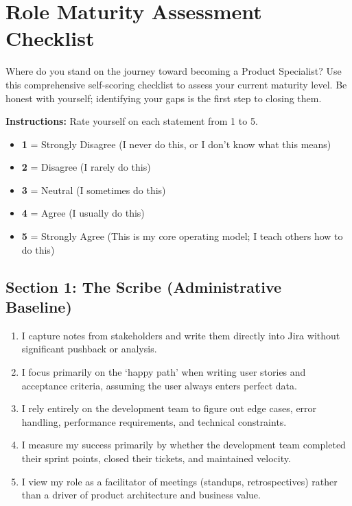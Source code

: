 \section{Role Maturity Assessment
Checklist}\label{role-maturity-assessment-checklist}

Where do you stand on the journey toward becoming a Product Specialist?
Use this comprehensive self-scoring checklist to assess your current
maturity level. Be honest with yourself; identifying your gaps is the
first step to closing them.

\textbf{Instructions:} Rate yourself on each statement from 1 to 5.

\begin{itemize}
\tightlist
\item
  \textbf{1} = Strongly Disagree (I never do this, or I don't know what
  this means)
\item
  \textbf{2} = Disagree (I rarely do this)
\item
  \textbf{3} = Neutral (I sometimes do this)
\item
  \textbf{4} = Agree (I usually do this)
\item
  \textbf{5} = Strongly Agree (This is my core operating model; I teach
  others how to do this)
\end{itemize}

\subsection{Section 1: The Scribe (Administrative
Baseline)}\label{section-1-the-scribe-administrative-baseline}

\begin{enumerate}
\def\labelenumi{\arabic{enumi}.}
\tightlist
\item
  I capture notes from stakeholders and write them directly into Jira
  without significant pushback or analysis.
\item
  I focus primarily on the `happy path' when writing user stories and
  acceptance criteria, assuming the user always enters perfect data.
\item
  I rely entirely on the development team to figure out edge cases,
  error handling, performance requirements, and technical constraints.
\item
  I measure my success primarily by whether the development team
  completed their sprint points, closed their tickets, and maintained
  velocity.
\item
  I view my role as a facilitator of meetings (standups, retrospectives)
  rather than a driver of product architecture and business value.
\end{enumerate}

